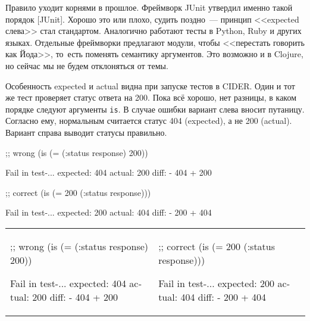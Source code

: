 \fi


Правило уходит корнями в прошлое. Фреймворк JUnit утвердил именно такой порядок
[JUnit].
Хорошо это или плохо, судить поздно~--- принцип <<expected слева>> стал
стандартом. Аналогично работают тесты в Python, Ruby и других языках. Отдельные
фреймворки предлагают модули, чтобы <<перестать говорить как Йода>>, то~есть
поменять семантику аргументов. Это возможно и в Clojure, но сейчас мы не будем
отклоняться от темы.


Особенность expected и actual видна при запуске тестов в CIDER. Один и тот же
тест проверяет статус ответа на 200. Пока всё хорошо, нет разницы, в каком
порядке следуют аргументы \verb|is|. В случае ошибки вариант слева вносит
путаницу. Согласно ему, нормальным считается статус 404 (expected), а не 200
(actual). Вариант справа выводит статусы правильно.

\ifx\DEVICETYPE\MOBILE

\begin{english}
  \begin{clojure}
;; wrong
(is (= (:status response)
       200))

Fail in test-...
expected: 404
  actual: 200
    diff: - 404
          + 200
  \end{clojure}

\splitter

  \begin{clojure}
;; correct
(is (= 200
       (:status response)))

Fail in test-...
expected: 200
  actual: 404
    diff: - 200
          + 404
  \end{clojure}
\end{english}

\else

\begin{english}

\noindent
\begin{tabular}{ @{}p{5.5cm} @{}p{5cm} }

  \begin{clojure}
;; wrong
(is (= (:status response)
       200))

Fail in test-...
expected: 404
  actual: 200
    diff: - 404
          + 200
  \end{clojure}

&

  \begin{clojure}
;; correct
(is (= 200
       (:status response)))

Fail in test-...
expected: 200
  actual: 404
    diff: - 200
          + 404
  \end{clojure}

\end{tabular}

\end{english}

